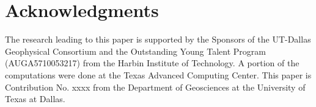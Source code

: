 \documentclass[manuscript,ulem,graphix,revised]{geophysics}
\begin{document}
\section{Acknowledgments}

The research leading to this paper is supported by the Sponsors of the
UT-Dallas Geophysical Consortium and the Outstanding Young Talent Program (AUGA5710053217) from the Harbin Institute of Technology. A portion of the computations were done at the Texas Advanced Computing Center. This paper is Contribution No. xxxx
from the Department of Geosciences at the University of Texas at Dallas.



\newpage


\end{document}
